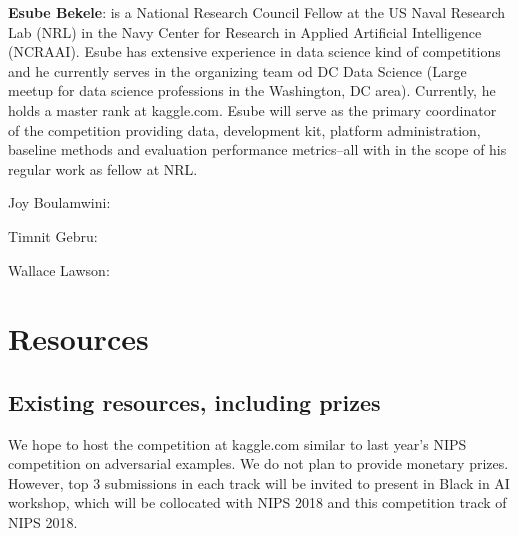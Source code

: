 \documentclass[11pt, oneside]{article}
\begin{document}
{\bf Esube Bekele}: is a National Research Council Fellow at the US Naval Research Lab (NRL) in the Navy Center for Research in Applied Artificial Intelligence (NCRAAI). Esube has extensive experience in data science kind of competitions and he currently serves in the organizing team od DC Data Science (Large meetup for data science professions in the Washington, DC area). Currently, he holds a master rank at kaggle.com. Esube will serve as the primary coordinator of the competition providing data, development kit, platform administration, baseline methods and evaluation performance metrics--all with in the scope of his regular work as fellow at NRL.

{Joy Boulamwini}: 

{Timnit Gebru}:

{Wallace Lawson}:



\section{Resources}
\subsection{Existing resources, including prizes}

We hope to host the competition at kaggle.com similar to last year's NIPS competition on adversarial examples. We do not plan to provide monetary prizes. However, top 3 submissions in each track will be invited to present in Black in AI workshop, which will be collocated with NIPS 2018 and this competition track of NIPS 2018.



%

\end{document}
